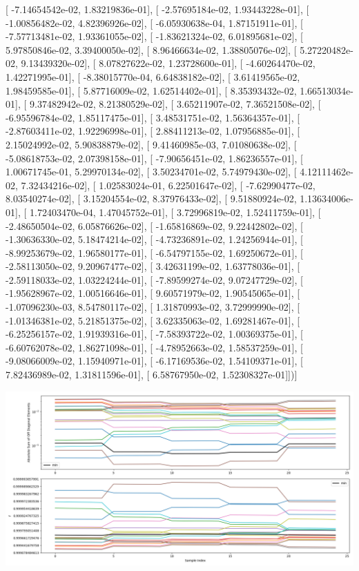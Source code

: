 \documentclass{article}
\begin{document}
       [ -7.14654542e-02,   1.83219836e-01],
       [ -2.57695184e-02,   1.93443228e-01],
       [ -1.00856482e-02,   4.82396926e-02],
       [ -6.05930638e-04,   1.87151911e-01],
       [ -7.57713481e-02,   1.93361055e-02],
       [ -1.83621324e-02,   6.01895681e-02],
       [  5.97850846e-02,   3.39400050e-02],
       [  8.96466634e-02,   1.38805076e-02],
       [  5.27220482e-02,   9.13439320e-02],
       [  8.07827622e-02,   1.23728600e-01],
       [ -4.60264470e-02,   1.42271995e-01],
       [ -8.38015770e-04,   6.64838182e-02],
       [  3.61419565e-02,   1.98459585e-01],
       [  5.87716009e-02,   1.62514402e-01],
       [  8.35393432e-02,   1.66513034e-01],
       [  9.37482942e-02,   8.21380529e-02],
       [  3.65211907e-02,   7.36521508e-02],
       [ -6.95596784e-02,   1.85117475e-01],
       [  3.48531751e-02,   1.56364357e-01],
       [ -2.87603411e-02,   1.92296998e-01],
       [  2.88411213e-02,   1.07956885e-01],
       [  2.15024992e-02,   5.90838879e-02],
       [  9.41460985e-03,   7.01080638e-02],
       [ -5.08618753e-02,   2.07398158e-01],
       [ -7.90656451e-02,   1.86236557e-01],
       [  1.00671745e-01,   5.29970134e-02],
       [  3.50234701e-02,   5.74979430e-02],
       [  4.12111462e-02,   7.32434216e-02],
       [  1.02583024e-01,   6.22501647e-02],
       [ -7.62990477e-02,   8.03540274e-02],
       [  3.15204554e-02,   8.37976433e-02],
       [  9.51880924e-02,   1.13634006e-01],
       [  1.72403470e-04,   1.47045752e-01],
       [  3.72996819e-02,   1.52411759e-01],
       [ -2.48650504e-02,   6.05876626e-02],
       [ -1.65816869e-02,   9.22442802e-02],
       [ -1.30636330e-02,   5.18474214e-02],
       [ -4.73236891e-02,   1.24256944e-01],
       [ -8.99253679e-02,   1.96580177e-01],
       [ -6.54797155e-02,   1.69250672e-01],
       [ -2.58113050e-02,   9.20967477e-02],
       [  3.42631199e-02,   1.63778036e-01],
       [ -2.59118033e-02,   1.03224244e-01],
       [ -7.89599274e-02,   9.07247729e-02],
       [ -1.95628967e-02,   1.00516646e-01],
       [  9.60571979e-02,   1.90545065e-01],
       [ -1.07096230e-03,   8.54780117e-02],
       [  1.31870993e-02,   3.72999990e-02],
       [ -1.01346381e-02,   5.21851375e-02],
       [  3.62335063e-02,   1.69281467e-01],
       [ -6.25256157e-02,   1.91939316e-01],
       [ -7.58393722e-02,   1.00369375e-01],
       [ -6.60762078e-02,   1.86271098e-01],
       [ -4.78952663e-02,   1.58537259e-01],
       [ -9.08066009e-02,   1.15940971e-01],
       [ -6.17169536e-02,   1.54109371e-01],
       [  7.82436989e-02,   1.31811596e-01],
       [  6.58767950e-02,   1.52308327e-01]])]
\begin{center}
\includegraphics[scale=.9]{report_pickled_controls182/control_dpn_all.png}

\end{center}
\end{document}
